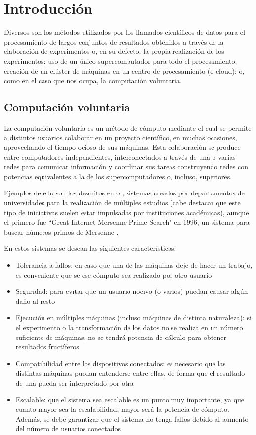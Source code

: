 \documentclass[runningheads,a4paper]{llncs}
\begin{document}
\section{Introducci\'on}
%
Diversos son los m\'etodos utilizados por los llamados cient\'ificos
de datos para el procesamiento de largos conjuntos de resultados obtenidos
a trav\'es de la elaboraci\'on de experimentos o, en su defecto, la propia
realizaci\'on de los experimentos: uso de un \'unico supercomputador para
todo el procesamiento; creaci\'on de un cl\'uster de m\'aquinas en un centro
de procesamiento (o cloud); o, como en el caso que nos ocupa, la computaci\'on voluntaria.

\subsection{Computaci\'on voluntaria}
La computaci\'on voluntaria es un m\'etodo de c\'omputo mediante el cual se
permite a distintos usuarios colaborar en un proyecto cient\'ifico,
en muchas ocasiones, aprovechando el tiempo ocioso de sus m\'aquinas. Esta colaboraci\'on
se produce entre computadores independientes, interconectados a trav\'es de una o varias redes
para comunicar informaci\'on y coordinar sus tareas construyendo redes con potencias
equivalentes a la de los supercomputadores o, incluso, superiores.

Ejemplos de ello son los descritos en \cite{seti} o \cite{climate}, sistemas creados por
departamentos de universidades para la realizaci\'on de m\'ultiples estudios
(cabe destacar que este tipo de iniciativas suelen estar impulsadas por
instituciones acad\'emicas), aunque el primero fue ``Great Internet Mersenne Prime Search" en 1996,
un sistema para buscar n\'umeros primos de Mersenne \cite{gimps}.

En estos sistemas se desean las siguientes caracter\'isticas:
\begin{itemize}
  \item Tolerancia a fallos: en caso que una de las m\'aquinas deje de hacer un trabajo, es
  conveniente que se ese c\'omputo sea realizado por otro usuario
  \item Seguridad: para evitar que un usuario nocivo (o varios) puedan causar alg\'un da\~no
  al resto
  \item Ejecuci\'on en m\'ultiples m\'aquinas (incluso m\'aquinas de distinta naturaleza):
  si el experimento o la transformaci\'on de los datos no se realiza en un n\'umero suficiente
  de m\'aquinas, no se tendr\'a potencia de c\'alculo para obtener resultados fruct\'iferos
  \item Compatibilidad entre los dispositivos conectados: es necesario que
  las distintas m\'aquinas puedan entenderse entre ellas, de forma que el resultado
  de una pueda ser interpretado por otra
  \item Escalable: que el sistema sea escalable es un punto muy importante, ya que
  cuanto mayor sea la escalabilidad, mayor ser\'a la potencia de c\'omputo. Adem\'as,
  se debe garantizar que el sistema no tenga fallos debido al aumento del n\'umero de
  usuarios conectados
\end{itemize}
\end{document}
